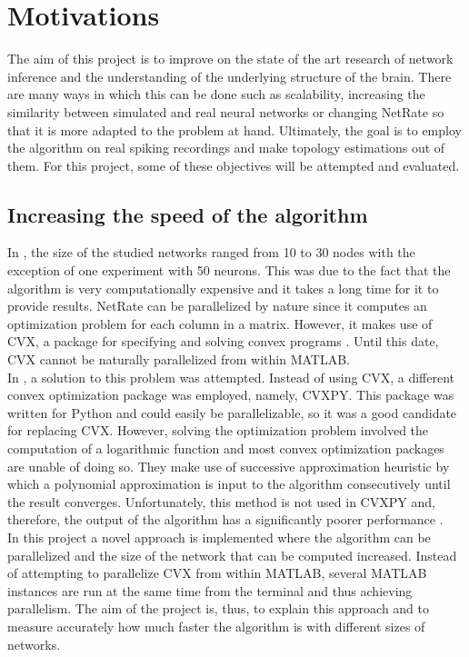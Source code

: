 \section{Motivations}

The aim of this project is to improve on the state of the art research of network inference and the understanding of the underlying structure of the brain. There are many ways in which this can be done such as scalability, increasing the similarity between simulated and real neural networks or changing NetRate so that it is more adapted to the problem at hand. Ultimately, the goal is to employ the algorithm on real spiking recordings and make topology estimations out of them. For this project, some of these objectives will be attempted and evaluated.

\subsection{Increasing the speed of the algorithm}

In \cite{alexandru2018estimating}, the size of the studied networks ranged from 10 to 30 nodes with the exception of one experiment with 50 neurons. This was due to the fact that the algorithm is very computationally expensive and it takes a long time for it to provide results. NetRate can be parallelized by nature since it computes an optimization problem for each column in a matrix. However, it makes use of CVX, a package for specifying and solving convex programs \cite{cvx,gb08}. Until this date, CVX cannot be naturally parallelized from within MATLAB. \\

In \cite{alexandru2018estimating}, a solution to this problem was attempted. Instead of using CVX, a different convex optimization package was employed, namely, CVXPY. This package was written for Python and could easily be parallelizable, so it was a good candidate for replacing CVX. However, solving the optimization problem involved the computation of a logarithmic function and most convex optimization packages are unable of doing so. They make use of successive approximation heuristic by which a polynomial approximation is input to the algorithm consecutively until the result converges. Unfortunately, this method is not used in CVXPY and, therefore, the output of the algorithm has a significantly poorer performance \cite{pranav_report}. \\

In this project a novel approach is implemented where the algorithm can be parallelized and the size of the network that can be computed increased. Instead of attempting to parallelize CVX from within MATLAB, several MATLAB instances are run at the same time from the terminal and thus achieving parallelism. The aim of the project is, thus, to explain this approach and to measure accurately how much faster the algorithm is with different sizes of networks. 


